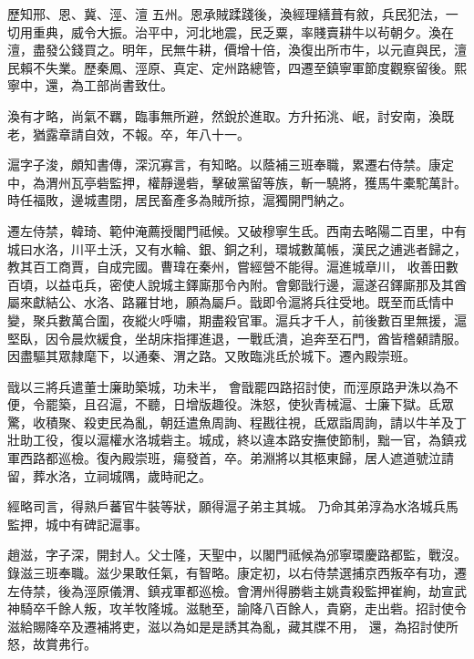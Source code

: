 \begin{pinyinscope}
 歷知邢、恩、冀、涇、澶
 五州。恩承賊蹂踐後，渙經理繕葺有敘，兵民犯法，一切用重典，威令大振。治平中，河北地震，民乏粟，率賤賣耕牛以茍朝夕。渙在澶，盡發公錢買之。明年，民無牛耕，價增十倍，渙復出所市牛，以元直與民，澶民賴不失業。歷秦鳳、涇原、真定、定州路總管，四遷至鎮寧軍節度觀察留後。熙寧中，還，為工部尚書致仕。



 渙有才略，尚氣不羈，臨事無所避，然銳於進取。方升拓洮、岷，討安南，渙既老，猶露章請自效，不報。卒，年八十一。



 滬字子浚，頗知書傳，深沉寡言，有知略。以蔭補三班奉職，累遷右侍禁。康定中，為渭州瓦亭砦監押，權靜邊砦，擊破黨留等族，斬一驍將，獲馬牛橐駝萬計。時任福敗，邊城晝閉，居民畜產多為賊所掠，滬獨開門納之。



 遷左侍禁，韓琦、範仲淹薦授閣門祗候。又破穆寧生氐。西南去略陽二百里，中有城曰水洛，川平土沃，又有水輪、銀、銅之利，環城數萬帳，漢民之逋逃者歸之，教其百工商賈，自成完國。曹瑋在秦州，嘗經營不能得。滬進城章川，
 收善田數百頃，以益屯兵，密使人說城主鐸廝那令內附。會鄭戩行邊，滬遂召鐸廝那及其酋屬來獻結公、水洛、路羅甘地，願為屬戶。戩即令滬將兵往受地。既至而氐情中變，聚兵數萬合圍，夜縱火呼嘯，期盡殺官軍。滬兵才千人，前後數百里無援，滬堅臥，因令晨炊緩食，坐胡床指揮進退，一戰氐潰，追奔至石門，酋皆稽顙請服。因盡驅其眾隸麾下，以通秦、渭之路。又敗臨洮氐於城下。遷內殿崇班。



 戩以三將兵遣董士廉助築城，功未半，
 會戩罷四路招討使，而涇原路尹洙以為不便，令罷築，且召滬，不聽，日增版趣役。洙怒，使狄青械滬、士廉下獄。氐眾驚，收積聚、殺吏民為亂，朝廷遣魚周詢、程戡往視，氐眾詣周詢，請以牛羊及丁壯助工役，復以滬權水洛城砦主。城成，終以違本路安撫使節制，黜一官，為鎮戎軍西路都巡檢。復內殿崇班，瘍發首，卒。弟淵將以其柩東歸，居人遮道號泣請留，葬水洛，立祠城隅，歲時祀之。



 經略司言，得熟戶蕃官牛裝等狀，願得滬子弟主其城。
 乃命其弟淳為水洛城兵馬監押，城中有碑記滬事。



 趙滋，字子深，開封人。父士隆，天聖中，以閣門祗候為邠寧環慶路都監，戰沒。錄滋三班奉職。滋少果敢任氣，有智略。康定初，以右侍禁選捕京西叛卒有功，遷左侍禁，後為涇原儀渭、鎮戎軍都巡檢。會渭州得勝砦主姚貴殺監押崔絢，劫宣武神騎卒千餘人叛，攻羊牧隆城。滋馳至，諭降八百餘人，貴窮，走出砦。招討使令滋給賜降卒及遷補將吏，滋以為如是是誘其為亂，藏其牒不用，
 還，為招討使所怒，故賞弗行。




\end{pinyinscope}
